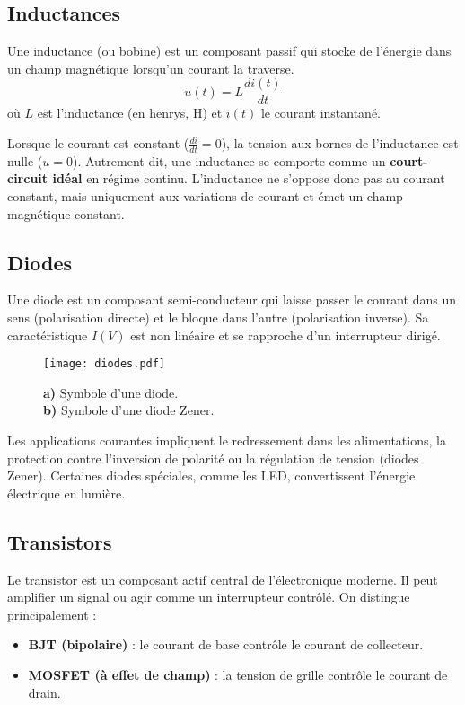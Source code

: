 \subsection{Inductances} \label{subsec:inductors}
Une inductance (ou bobine) est un composant passif qui stocke de l’énergie
dans un champ magnétique lorsqu’un courant la traverse.
\[
u(t) = L \frac{di(t)}{dt}
\]
où \(L\) est l’inductance (en henrys, \unit{\henry}) et \(i(t)\) le courant instantané.

\vspace{\baselineskip}
Lorsque le courant est constant (\(\frac{di}{dt} = 0\)), la tension aux bornes
de l’inductance est nulle (\(u = 0\)). Autrement dit, une inductance se comporte
comme un \textbf{court-circuit idéal} en régime continu. L’inductance ne s’oppose
donc pas au courant constant, mais uniquement aux variations de courant et \'emet un champ
magnétique constant.


\subsection{Diodes} \label{subsec:diodes}
Une diode est un composant semi-conducteur qui laisse passer le courant
dans un sens (polarisation directe) et le bloque dans l’autre (polarisation inverse).
Sa caractéristique \(I(V)\) est non linéaire et se rapproche
d’un interrupteur dirigé.
\begin{figure}[H]
    \centering
    \texttt{[image: diodes.pdf]}
    \caption{\newline
        \textbf{a)} Symbole d’une diode.\\
        \textbf{b)} Symbole d’une diode Zener.
    }
\end{figure}
Les applications courantes impliquent le redressement dans les alimentations, la protection contre l’inversion de polarité
ou la régulation de tension (diodes Zener).
Certaines diodes spéciales, comme les LED, convertissent l’énergie électrique en lumière.

\subsection{Transistors} \label{subsec:transistors}
Le transistor est un composant actif central de l’électronique moderne.
Il peut amplifier un signal ou agir comme un interrupteur contrôlé.
On distingue principalement :
\begin{itemize}
  \item \textbf{BJT (bipolaire)} : le courant de base contrôle
  le courant de collecteur.
  \item \textbf{MOSFET (à effet de champ)} : la tension de grille contrôle
  le courant de drain.
\end{itemize}

